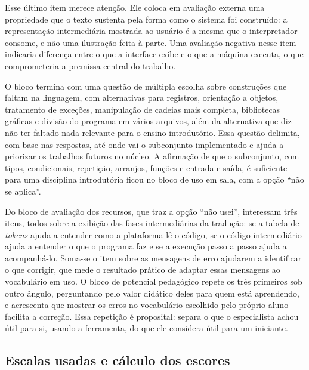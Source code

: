 Esse último item merece atenção. Ele coloca em avaliação externa uma propriedade que o texto sustenta pela forma como o sistema foi construído: a representação intermediária mostrada ao usuário é a mesma que o interpretador consome, e não uma ilustração feita à parte. Uma avaliação negativa nesse item indicaria diferença entre o que a interface exibe e o que a máquina executa, o que comprometeria a premissa central do trabalho.

O bloco termina com uma questão de múltipla escolha sobre construções que faltam na linguagem, com alternativas para registros, orientação a objetos, tratamento de exceções, manipulação de cadeias mais completa, bibliotecas gráficas e divisão do programa em vários arquivos, além da alternativa que diz não ter faltado nada relevante para o ensino introdutório. Essa questão delimita, com base nas respostas, até onde vai o subconjunto implementado e ajuda a priorizar os trabalhos futuros no núcleo. A afirmação de que o subconjunto, com tipos, condicionais, repetição, arranjos, funções e entrada e saída, é suficiente para uma disciplina introdutória ficou no bloco de uso em sala, com a opção ``não se aplica''.

Do bloco de avaliação dos recursos, que traz a opção ``não usei'', interessam três itens, todos sobre a exibição das fases intermediárias da tradução: se a tabela de \textit{tokens} ajuda a entender como a plataforma lê o código, se o código intermediário ajuda a entender o que o programa faz e se a execução passo a passo ajuda a acompanhá-lo. Soma-se o item sobre as mensagens de erro ajudarem a identificar o que corrigir, que mede o resultado prático de adaptar essas mensagens ao vocabulário em uso. O bloco de potencial pedagógico repete os três primeiros sob outro ângulo, perguntando pelo valor didático deles para quem está aprendendo, e acrescenta que mostrar os erros no vocabulário escolhido pelo próprio aluno facilita a correção. Essa repetição é proposital: separa o que o especialista achou útil para si, usando a ferramenta, do que ele considera útil para um iniciante.

\subsection{Escalas usadas e cálculo dos escores}
\label{subsec:escalas-escores}

